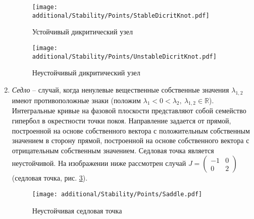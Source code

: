 \begin{enumerate}
			\begin{multicols}{2}

				\begin{figure}[H]
					\centering
					\texttt{[image: additional/Stability/Points/StableDicritKnot.pdf]}
					\caption{Устойчивый дикритический узел}
					\label{Stability:StableDicritKnot}
				\end{figure}

			\columnbreak

				\begin{figure}[H]
					\centering
					\texttt{[image: additional/Stability/Points/UnstableDicritKnot.pdf]}
					\caption{Неустойчивый дикритический узел}
					\label{Stability:UnstableDicritKnot}
				\end{figure}

			\end{multicols}

		\item \textit{Седло} -- случай, когда ненулевые вещественные собственные значения $\lambda_{1, 2}$ имеют противоположные знаки (положим $\lambda_1 < 0 < \lambda_2, ~ \lambda_{1, 2} \in \mathbb{R}$). Интегральные кривые на фазовой плоскости представляют собой семейство гипербол в окрестности точки покоя. Направление задается от прямой, построенной на основе собственного вектора с положительным собственным значением в сторону прямой, построенной на основе собственного вектора с отрицательным собственным значением. Седловая точка является неустойчивой. На изображении ниже рассмотрен случай $J = \begin{pmatrix} -1 & 0 \\ 0 & 2 \end{pmatrix}$ (седловая точка, рис. \ref{Stability:Saddle}).

			\begin{figure}[H]
				\centering
				\texttt{[image: additional/Stability/Points/Saddle.pdf]}
				\caption{Неустойчивая седловая точка}
				\label{Stability:Saddle}
			\end{figure}


\end{enumerate}
